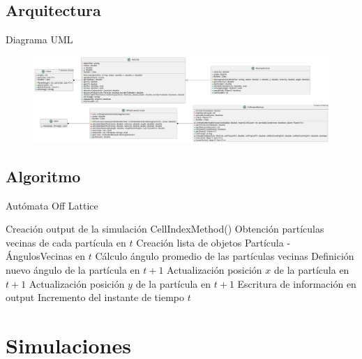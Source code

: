 \documentclass{beamer}
\begin{document}
    \subsection{Arquitectura}
    \begin{frame}{Diagrama UML}
        \begin{figure}[htbp]
            \centering
            \includegraphics[width=\textwidth]{./architecture-landscape}
            \label{fig:architecture}
        \end{figure}
    \end{frame}

    \subsection{Algoritmo}
    \begin{frame}{Autómata Off Lattice}
        \begin{algorithmic}[1]
            \small
            \State Creación output de la simulación
                \State CellIndexMethod()
                \State Obtención partículas vecinas de cada partícula en $t$
                \State Creación lista de objetos Partícula - ÁngulosVecinas en $t$
                    \State Cálculo ángulo promedio de las partículas vecinas
                    \State Definición nuevo ángulo de la partícula en $t+1$
                    \State Actualización posición $x$ de la partícula en $t+1$
                    \State Actualización posición $y$ de la partícula en $t+1$
                    \State Escritura de información en output
                \EndFor
                \State Incremento del instante de tiempo $t$
            \EndWhile
        \end{algorithmic}
        \label{alg:algorithm}

    \end{frame}


    \section{Simulaciones}
\end{document}
